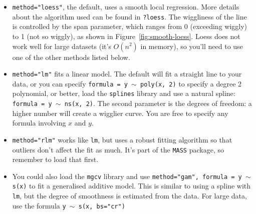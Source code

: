 \begin{itemize}
  \item {\tt method="loess"}, the default, uses a smooth local regression.  More details about the algorithm used can be found in {\tt ?loess}.  The wiggliness of the line is controlled by the span parameter, which ranges from 0 (exceeding wiggly) to 1 (not so wiggly), as shown in Figure~\ref{fig:smooth-loess}.  Loess does not work well for large datasets (it's $O(n^2)$ in memory), so you'll need to use one of the other methods listed below.

    

  \item {\tt method="lm"} fits a linear model.  The default will fit a straight line to your data, or you can specify {\tt formula = y $\sim$ poly(x, 2)} to specify a degree 2 polynomial, or better, load the {\tt splines} library and use a natural spline: {\tt formula = y $\sim$ ns(x, 2)}. The second parameter is the degrees of freedom: a higher number will create a wigglier curve. You are free to specify any formula involving $x$ and $y$.  

    

  \item {\tt method="rlm"} works like {\tt lm}, but uses a robust fitting algorithm so that outliers don't affect the fit as much.  It's part of the {\tt MASS} package, so remember to load that first.

  \item You could also load the {\tt mgcv} library and use {\tt method="gam", formula = y $\sim$ s(x)} to fit a generalised additive model.  This is similar 
to using a spline with {\tt lm}, but the degree of smoothness is estimated from the data.  For large data, use the formula {\tt y $\sim$ s(x, bs="cr")}
 

\end{itemize}
